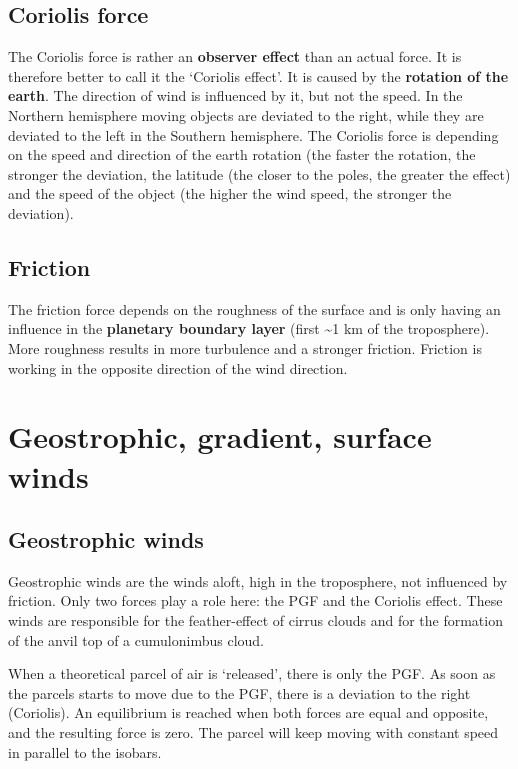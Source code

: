 \documentclass[oneside]{book}
\begin{document}
\subsection{Coriolis force}\label{coriolis-force}

The Coriolis force is rather an \textbf{observer effect} than an actual
force. It is therefore better to call it the `Coriolis effect'. It is
caused by the \textbf{rotation of the earth}. The direction of wind is
influenced by it, but not the speed. In the Northern hemisphere moving
objects are deviated to the right, while they are deviated to the left
in the Southern hemisphere. The Coriolis force is depending on the speed
and direction of the earth rotation (the faster the rotation, the
stronger the deviation, the latitude (the closer to the poles, the
greater the effect) and the speed of the object (the higher the wind
speed, the stronger the deviation).

\subsection{Friction}\label{friction}

The friction force depends on the roughness of the surface and is only
having an influence in the \textbf{planetary boundary layer} (first
\textasciitilde{}1 km of the troposphere). More roughness results in
more turbulence and a stronger friction. Friction is working in the
opposite direction of the wind direction.

\section{Geostrophic, gradient, surface
winds}\label{geostrophic-gradient-surface-winds}

\subsection{Geostrophic winds}\label{geostrophic-winds}

Geostrophic winds are the winds aloft, high in the troposphere, not
influenced by friction. Only two forces play a role here: the PGF and
the Coriolis effect. These winds are responsible for the feather-effect
of cirrus clouds and for the formation of the anvil top of a
cumulonimbus cloud.

When a theoretical parcel of air is `released', there is only the PGF.
As soon as the parcels starts to move due to the PGF, there is a
deviation to the right (Coriolis). An equilibrium is reached when both
forces are equal and opposite, and the resulting force is zero. The
parcel will keep moving with constant speed in parallel to the isobars.
\end{document}
